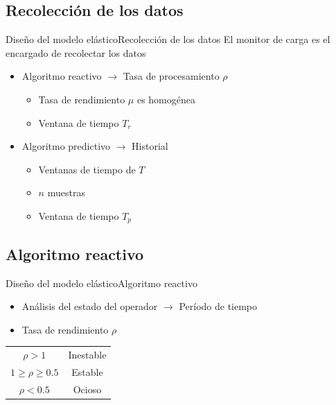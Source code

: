 \subsection*{Recolección de los datos}
\begin{frame}{Diseño del modelo elástico}{Recolección de los datos}
El monitor de carga es el encargado de recolectar los datos
\begin{itemize}
	\item Algoritmo reactivo $\rightarrow$ Tasa de procesamiento $\rho$
	\begin{itemize}
		\item Tasa de rendimiento $\mu$ es homogénea
		\item Ventana de tiempo $T_r$
	\end{itemize}
	\item Algoritmo predictivo $\rightarrow$ Historial
	\begin{itemize}
		\item Ventanas de tiempo de $T$
		\item $n$ muestras
		\item Ventana de tiempo $T_p$
	\end{itemize}
\end{itemize}

\end{frame}

\subsection*{Algoritmo reactivo}
\begin{frame}{Diseño del modelo elástico}{Algoritmo reactivo}
\begin{itemize}
\item Análisis del estado del operador $\rightarrow$ Período de tiempo
\item Tasa de rendimiento $\rho$
\end{itemize}
\hspace{1cm}
\begin{tabular}{c c}
	$\rho > 1$ & Inestable \\
	$1 \geqslant \rho \geqslant 0.5$ & Estable \\
	$\rho < 0.5$ & Ocioso
\end{tabular}
\end{frame}

